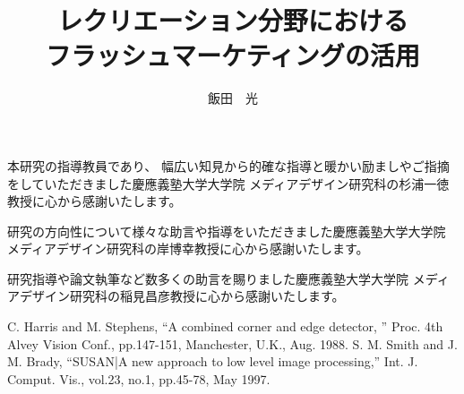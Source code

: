 \documentclass[12pt]{jreport}
\title{レクリエーション分野における\\フラッシュマーケティングの活用}
\author{飯田　光}
\begin{document}
%
%
\titlepage
\comemberspage
\firstabstract
\secondabstract
%
%
\toc
\newpage
\listoffigures
\newpage
\listoftables
%
%
\newpage
{}



%




%
%
%
%
\acknowledgements

本研究の指導教員であり、
幅広い知見から的確な指導と暖かい励ましやご指摘をしていただきました慶應義塾大学大学院
メディアデザイン研究科の杉浦一徳教授に心から感謝いたします。

研究の方向性について様々な助言や指導をいただきました慶應義塾大学大学院 メディアデザイン研究科の岸博幸教授に心から感謝いたします。

研究指導や論文執筆など数多くの助言を賜りました慶應義塾大学大学院 メディアデザイン研究科の稲見昌彦教授に心から感謝いたします。
%
%
\newpage
{}



%

%





\begin{thebibliography}{9}
	 C. Harris and M. Stephens,
	``A combined corner and edge detector, '' Proc. 4th Alvey Vision Conf.,
	pp.147-151, Manchester, U.K., Aug. 1988.
	 S. M. Smith and J. M. Brady,
	``SUSAN|A new approach to low level image processing,'' Int. J. Comput.
	Vis., vol.23, no.1, pp.45-78, May 1997.
\end{thebibliography}
%
%
%
\end{document}
